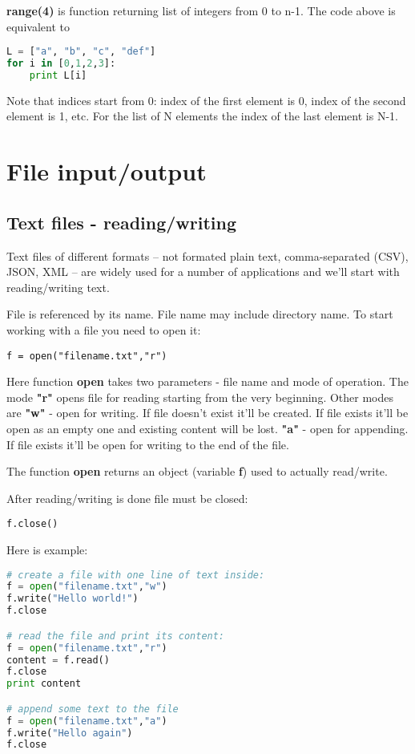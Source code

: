 \textbf{range(4)} is function returning list of integers from 0 to n-1.
The code above is equivalent to
\begin{lstlisting}[style=codelst2,language=Python,caption={Printing list elements by index - 2}]
L = ["a", "b", "c", "def"]
for i in [0,1,2,3]:
    print L[i]
\end{lstlisting}
Note that indices start from 0: index of the first element is 0, index of
the second element is 1, etc. For the list of N elements the index of the last element
is N-1.


\section{File input/output}

\subsection{Text files - reading/writing}

Text files of different formats -- not formated plain text,
comma-separated (CSV), JSON, XML -- are widely used for a number
of applications and we'll start with reading/writing text.

File is referenced by its name. File name may include directory name.
To start working with a file you need to open it:

\bigskip
\lstinline{f = open("filename.txt","r")}
\bigskip

Here function \textbf{open} takes two parameters - 
file name and mode of operation.
The mode \textbf{"r"} opens file for reading 
starting from the very beginning. Other modes are
\textbf{"w"} - open for writing. If file doesn't exist it'll 
be created. If file exists it'll be open as an empty one and 
existing content will be lost.
\textbf{"a"} - open for appending. If file exists it'll 
be open for writing to the end of the file.

The function \textbf{open} returns an object (variable \textbf{f}) 
used to actually read/write.

After reading/writing is done file must be closed:

\bigskip
\lstinline{f.close()}
\bigskip

Here is example:

\begin{lstlisting}[language=Python,style=codelst,caption={File operations}]
# create a file with one line of text inside:
f = open("filename.txt","w")
f.write("Hello world!")
f.close

# read the file and print its content:
f = open("filename.txt","r")
content = f.read()
f.close
print content

# append some text to the file
f = open("filename.txt","a")
f.write("Hello again")
f.close
\end{lstlisting}

